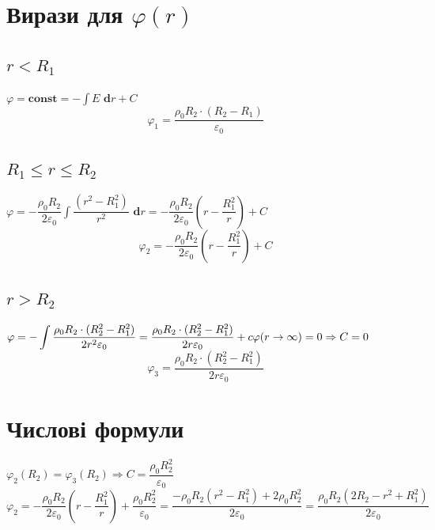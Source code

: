 \documentclass[a4paper,12pt]{article}
\newcommand\dd{\textbf{ d}}
\newcommand\const{\textbf{const}}
\begin{document}
\begin{justify}
 \section{Вирази для $\varphi(r)$}
 \subsection{$r<R_1$}
 $\varphi=\const=-\displaystyle\int E\dd r+C$
 \begin{equation}
  \varphi_1=\dfrac{\rho_0R_2\cdot(R_2-R_1)}{\varepsilon_0}
 \end{equation}
 \subsection{$R_1\leq r\leq R_2$}
 $\varphi=-\dfrac{\rho_0R_2}{2\varepsilon_0}\displaystyle\int\dfrac{(r^2-R_1^2)}{r^2}\dd r=-\dfrac{\rho_0R_2}{2\varepsilon_0}\left(r-\dfrac{R_1^2}{r}\right)+C$
 \begin{equation}
  \varphi_2=-\dfrac{\rho_0R_2}{2\varepsilon_0}\left(r-\dfrac{R_1^2}{r}\right)+C
 \end{equation}
 \subsection{$r>R_2$}
 $\varphi=-\displaystyle\int\dfrac{\rho_0R_2\cdot(R_2^2-R_1^2)}{2r^2\varepsilon_0}=\dfrac{\rho_0R_2\cdot(R_2^2-R_1^2)}{2r\varepsilon_0}+c\\\varphi(r\to\infty)=0\Rightarrow C=0$
 \begin{equation}
  \varphi_3=\dfrac{\rho_0R_2\cdot(R_2^2-R_1^2)}{2r\varepsilon_0}
 \end{equation}
 \section{Числові формули}
 $\varphi_2(R_2)=\varphi_3(R_2)\Rightarrow C=\dfrac{\rho_0R_2^2}{\varepsilon_0}$
 \begin{equation}
  \varphi_2=-\dfrac{\rho_0R_2}{2\varepsilon_0}\left(r-\dfrac{R_1^2}{r}\right)+\dfrac{\rho_0R_2^2}{\varepsilon_0}=\dfrac{-\rho_0R_2(r^2-R_1^2)+2\rho_0R_2^2}{2\varepsilon_0}=\dfrac{\rho_0R_2(2R_2-r^2+R_1^2)}{2\varepsilon_0}
 \end{equation}

\end{justify}
\end{document}
